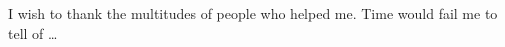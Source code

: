 \begin{acknowledgments}		%
I wish to thank the multitudes of people who helped me. Time would
fail me to tell of \ldots
\end{acknowledgments}

